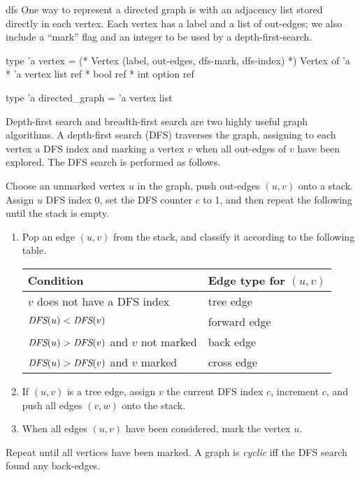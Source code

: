 %
\begin{exercise}{dfs}
One way to represent a directed graph is with an adjacency list stored directly in each vertex.
Each vertex has a label and a list of out-edges; we also include a ``mark'' flag and an integer to
be used by a depth-first-search.

\begin{ocaml}
type 'a vertex =
   (* Vertex (label, out-edges, dfs-mark, dfs-index) *)
   Vertex of 'a * 'a vertex list ref * bool ref * int option ref

type 'a directed_graph = 'a vertex list
\end{ocaml}
%
Depth-first search and breadth-first search are two highly useful graph algorithms.
A depth-first search (DFS) traverses the graph, assigning to each vertex a DFS index and
marking a vertex $v$ when all out-edges of $v$ have been explored.  The DFS search is performed as follows.

Choose an unmarked vertex $u$ in the graph, push out-edges $(u, v)$ onto a stack.  Assign $u$ DFS index 0, set
the DFS counter $c$ to 1, and then repeat the following until the stack is empty.

\begin{enumerate}
\item Pop an edge $(u, v)$ from the stack, and classify it according to the following
table.

\begin{center}
\begin{tabular}{l|l}
Condition & Edge type for $(u, v)$\\
\hline
$v$ does not have a DFS index & tree edge\\
$\textit{DFS}(u) < \textit{DFS}(v)$ & forward edge\\
$\textit{DFS}(u) > \textit{DFS}(v)$ and $v$ not marked & back edge\\
$\textit{DFS}(u) > \textit{DFS}(v)$ and $v$ marked & cross edge
\end{tabular}
\end{center}
%
\item
If $(u, v)$ is a tree edge, assign $v$ the current DFS index $c$, increment $c$, and push all edges
$(v, w)$ onto the stack.
\item
When all edges $(u, v)$ have been considered, mark the vertex $u$.
\end{enumerate}
%
Repeat until all vertices have been marked.
A graph is \emph{cyclic} iff the DFS search found any back-edges.


\end{exercise}

